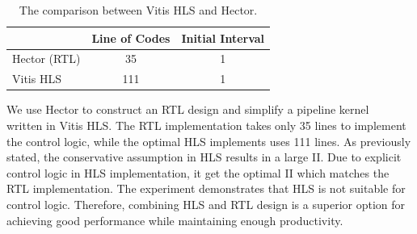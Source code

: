 
\begin{table}[htbp!]
\footnotesize
\renewcommand\arraystretch{1.5}
\begin{tabular}{lcc}
\hline
\multicolumn{1}{c}{} & Line of Codes & Initial Interval \\ \hline
Hector (RTL)         & 35            & 1                \\ \hline
Vitis HLS            & 111           & 1                \\ \hline
\end{tabular}
\caption{The comparison between Vitis HLS and Hector.}
\label{tab:shuffle}
\vspace{-9pt}
\end{table}

We use Hector to construct an RTL design and simplify a pipeline kernel~\cite{HiSparse} written in Vitis HLS. The RTL implementation takes only 35 lines to implement the control logic, while the optimal HLS implements uses 111 lines. As previously stated, the conservative assumption in HLS results in a large II. Due to explicit control logic in HLS implementation, it get the optimal II which matches the RTL implementation. The experiment demonstrates that HLS is not suitable for control logic. Therefore, combining HLS and RTL design is a superior option for achieving good performance while maintaining enough productivity.



